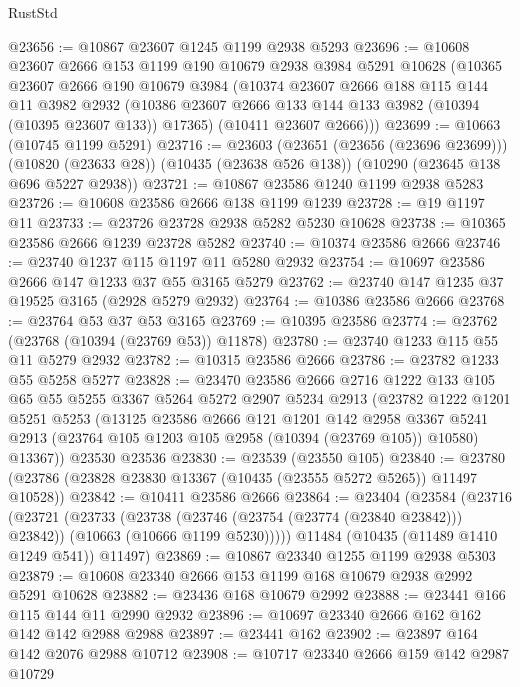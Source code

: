 \begin{lexlean}{RustStd}
\begin{coremodule}
@23656 := @10867 @23607 @1245 @1199 @2938 @5293
@23696 := @10608
    @23607
    @2666
    @153
    @1199
    @190
    @10679
    @2938
    @3984
    @5291
    @10628
    (@10365
      @23607
      @2666
      @190
      @10679
      @3984
      (@10374
        @23607
        @2666
        @188
        @115
        @144
        @11
        @3982
        @2932
        (@10386 @23607 @2666 @133 @144 @133 @3982 (@10394 (@10395 @23607 @133)) @17365)
        (@10411 @23607 @2666)))
@23699 := @10663 (@10745 @1199 @5291)
@23716 := @23603
    (@23651 (@23656 (@23696 @23699)))
    (@10820 (@23633 @28))
    (@10435 (@23638 @526 @138))
    (@10290 (@23645 @138 @696 @5227 @2938))
@23721 := @10867 @23586 @1240 @1199 @2938 @5283
@23726 := @10608 @23586 @2666 @138 @1199 @1239
@23728 := @19 @1197 @11
@23733 := @23726 @23728 @2938 @5282 @5230 @10628
@23738 := @10365 @23586 @2666 @1239 @23728 @5282
@23740 := @10374 @23586 @2666
@23746 := @23740 @1237 @115 @1197 @11 @5280 @2932
@23754 := @10697 @23586 @2666 @147 @1233 @37 @55 @3165 @5279
@23762 := @23740 @147 @1235 @37 @19525 @3165 (@2928 @5279 @2932)
@23764 := @10386 @23586 @2666
@23768 := @23764 @53 @37 @53 @3165
@23769 := @10395 @23586
@23774 := @23762 (@23768 (@10394 (@23769 @53)) @11878)
@23780 := @23740 @1233 @115 @55 @11 @5279 @2932
@23782 := @10315 @23586 @2666
@23786 := @23782 @1233 @55 @5258 @5277
@23828 := @23470
    @23586
    @2666
    @2716
    @1222
    @133
    @105
    @65
    @55
    @5255
    @3367
    @5264
    @5272
    @2907
    @5234
    @2913
    (@23782
      @1222
      @1201
      @5251
      @5253
      (@13125
        @23586
        @2666
        @121
        @1201
        @142
        @2958
        @3367
        @5241
        @2913
        (@23764 @105 @1203 @105 @2958 (@10394 (@23769 @105)) @10580)
        @13367))
    @23530
    @23536
@23830 := @23539 (@23550 @105)
@23840 := @23780 (@23786 (@23828 @23830 @13367 (@10435 (@23555 @5272 @5265)) @11497 @10528))
@23842 := @10411 @23586 @2666
@23864 := @23404
    (@23584
      (@23716
        (@23721
          (@23733
            (@23738 (@23746 (@23754 (@23774 (@23840 @23842))) @23842))
            (@10663 (@10666 @1199 @5230)))))
      @11484
      (@10435 (@11489 @1410 @1249 @541))
      @11497)
@23869 := @10867 @23340 @1255 @1199 @2938 @5303
@23879 := @10608 @23340 @2666 @153 @1199 @168 @10679 @2938 @2992 @5291 @10628
@23882 := @23436 @168 @10679 @2992
@23888 := @23441 @166 @115 @144 @11 @2990 @2932
@23896 := @10697 @23340 @2666 @162 @162 @142 @142 @2988 @2988
@23897 := @23441 @162
@23902 := @23897 @164 @142 @2076 @2988 @10712
@23908 := @10717 @23340 @2666 @159 @142 @2987 @10729

\end{coremodule}
\end{lexlean}

